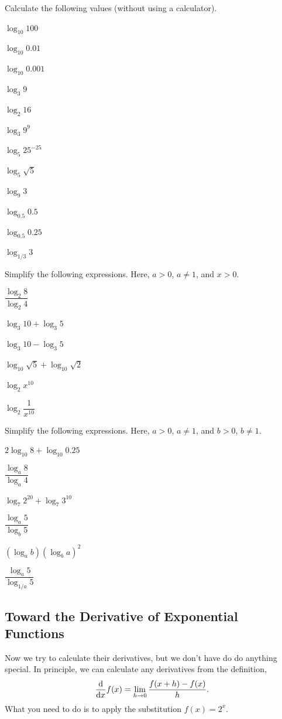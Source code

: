 \documentclass[11pt,pdfa,lastpage]{MishoNote}
\begin{document}
\begin{enumerate}[resume]
  \itemA Calculate the following values (without using a calculator).
\begin{menumerate}{4}
  \item $\log_{10}100$
  \item $\log_{10}0.01$
  \item $\log_{10}0.001$
  \item $\log_{3}9$
  \item $\log_2 16$
  \item $\log_{3}9^9$
  \item $\log_{5}25^{-25}$
  \item $\log_5\sqrt{5}$
  \item $\log_{9}3$
  \item $\log_{0.5}0.5$
  \item $\log_{0.5}0.25$
  \item $\log_{1/3}3$
\end{menumerate}
\itemA Simplify the following expressions. Here, $a>0$, $a\neq 1$, and $x>0$.
\begin{menumerate}{3}
  \item $\dfrac{\log_{2}8}{\log_{2}4}$
  \item $\log_3{10}+\log_3{5}$
  \item $\log_3{10}-\log_3{5}$
  \item $\log_{10}\sqrt{5}+\log_{10}\sqrt2$
  \item $\log_2 x^{10}$
  \item $\log_2 \dfrac{1}{x^{10}}$
\end{menumerate}
\itemB Simplify the following expressions. Here, $a>0$, $a\neq 1$, and $b>0$, $b\neq 1$.
\begin{menumerate}{3}
  \item $2\log_{10}8 + \log_{10}0.25$
  \item $\dfrac{\log_{a}8}{\log_{a}4}$
  \item $\log_7 2^{20}+\log_7 3^{10}$
  \item $\dfrac{\log_{a}5}{\log_{b}5}$
  \item $(\log_a b)(\log_b a)^2$
  \item $\dfrac{\log_{a}5}{\log_{1/a}5}$
\end{menumerate}
\end{enumerate}

\newpage

\subsection{Toward the Derivative of Exponential Functions}
Now we try to calculate their derivatives, but we don't have do do anything special.
In principle, we can calculate any derivatives from the definition,
\begin{equation}
  \diff{}{x}f(x)=\lim_{h\to 0}\frac{f(x+h)-f(x)}{h}.\label{eq:diff}
\end{equation}
What you need to do is to apply the substitution $f(x)=2^x$.
\end{document}
